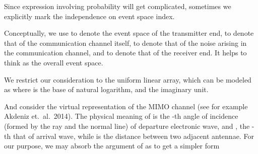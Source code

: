 \startchapter [title={Problem Setting}]

\startsection [title={Channel Model}]

Since expression involving probability will get complicated, sometimes we explicitly mark the independence on event space index.

Conceptually, we use  to denote the event space of the transmitter end,  to denote that of the communication channel itself,  to denote that of the noise arising in the communication channel, and  to denote that of the receiver end.
It helps to think  as the overall event space.

We restrict our consideration to the uniform linear array, which can be modeled as
where  is the base of natural logarithm, and  the imaginary unit.

And consider the virtual representation of the MIMO channel (see for example Akdeniz et.\ al.\ 2014).
The physical meaning of  is the -th angle of incidence (formed by the ray and the normal line) of departure electronic wave, and , the -th that of arrival wave, while  is the distance between two adjacent antennae.
For our purpose, we may absorb the argument of  as
to get a simpler form

\stopsection

\startsection [title={System Model}]

